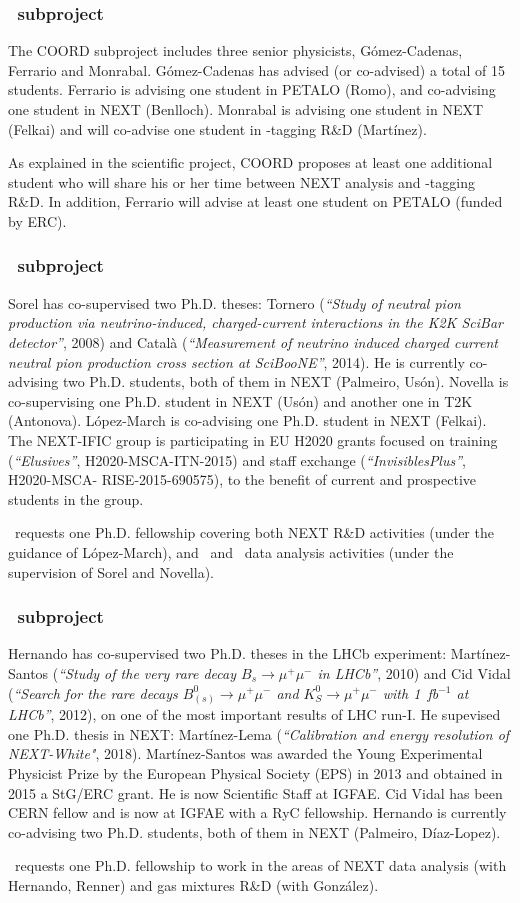 \subsubsection*{\sDIPC\ subproject}
The COORD subproject includes three senior physicists, G\'omez-Cadenas, Ferrario and Monrabal. G\'omez-Cadenas has advised (or co-advised) a total of 15 students.  Ferrario is advising one student in PETALO (Romo), and co-advising one student in NEXT (Benlloch). Monrabal is advising one student in NEXT (Felkai) and will co-advise one student in \Bapp-tagging R\&D (Mart\'{i}nez).

As explained in the scientific project, COORD proposes at least one additional student who will share his or her time between NEXT analysis and \Bapp-tagging R\&D. In addition, Ferrario will advise at least one student on PETALO (funded by ERC).

\subsubsection*{\sIFIC\ subproject}
Sorel has co-supervised two Ph.D. theses: Tornero ({\it ``Study of neutral pion production via neutrino-induced, charged-current interactions in the K2K SciBar detector''}, 2008) and Catal\`a ({\it ``Measurement of neutrino induced charged current neutral pion production cross section at SciBooNE''}, 2014). He is currently co-advising two Ph.D. students, both of them in NEXT (Palmeiro, Us\'on). Novella is co-supervising one Ph.D. student in NEXT (Us\'on) and another one in T2K (Antonova). L\'opez-March is co-advising one Ph.D. student in NEXT (Felkai). The NEXT-IFIC group is participating in EU H2020 grants focused on training ({\it ``Elusives''}, H2020-MSCA-ITN-2015) and staff exchange ({\it ``InvisiblesPlus''}, H2020-MSCA- RISE-2015-690575), to the benefit of current and prospective students in the group.

\sIFIC\ requests one Ph.D. fellowship covering both NEXT R\&D activities (under the guidance of L\'opez-March), and \NEW\ and \Next\ data analysis activities (under the supervision of Sorel and Novella).

\subsubsection*{\sUSC\ subproject}

Hernando has co-supervised two Ph.D. theses in the LHCb experiment: Mart\'{i}nez-Santos ({\it ``Study of the very rare decay $B_s\to\mu^+\mu^-$ in LHCb''}, 2010) and Cid Vidal ({\it ``Search for the rare decays $B^0_{(s)}\to\mu^+\mu^-$ and $K^0_S\to\mu^+\mu^-$ with 1~fb$^{-1}$ at LHCb''}, 2012), on one of the most important results of LHC run-I. He supevised one Ph.D. thesis in NEXT: Mart\'{i}nez-Lema ({\it ``Calibration and energy resolution of NEXT-White"}, 2018). Mart\'{i}nez-Santos was awarded the Young Experimental Physicist Prize by the European Physical Society (EPS) in 2013 and obtained in 2015 a StG/ERC grant. He is now Scientific Staff at IGFAE. Cid Vidal has been CERN fellow and is now at IGFAE with a RyC fellowship. Hernando is currently co-advising two Ph.D. students, both of them in NEXT (Palmeiro, D\'{i}az-Lopez).

\sUSC\ requests one Ph.D. fellowship to work in the areas of NEXT data analysis (with Hernando, Renner) and gas mixtures R\&D (with Gonz\'alez).
